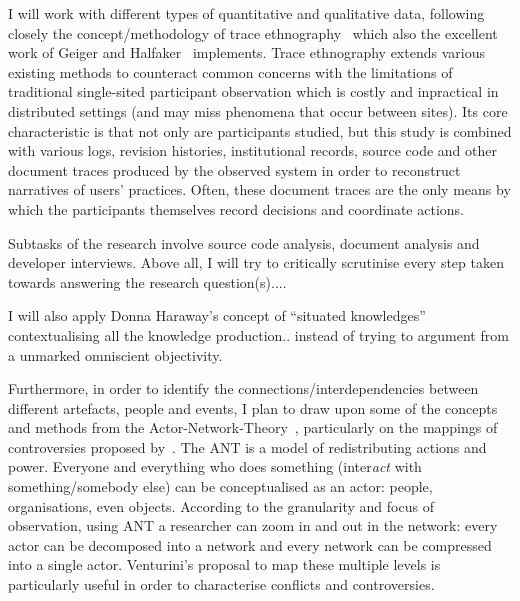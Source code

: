 \documentclass[pdftex,a4paper,11pt]{scrartcl}
\begin{document}
I will work with different types of quantitative and qualitative data, following closely the concept/methodology of trace ethnography~\cite{GeiRib2011} which also the excellent work of Geiger and Halfaker~\cite{GeiHal2017} implements.
Trace ethnography extends various existing methods to counteract common concerns with the limitations of traditional single-sited participant observation which is costly and inpractical in distributed settings (and may miss phenomena that occur between sites).
Its core characteristic is that not only are participants studied, but this study is combined with various logs, revision histories, institutional records, source code and other document traces produced by the observed system in order to reconstruct narratives of users' practices.
Often, these document traces are the only means by which the participants themselves record decisions and coordinate actions.


Subtasks of the research involve source code analysis, document analysis and developer interviews.
Above all, I will try to critically scrutinise every step taken towards answering the research question(s)....


I will also apply Donna Haraway's concept of ``situated knowledges'' contextualising all the knowledge production.. instead of trying to argument from a unmarked omniscient objectivity.

Furthermore, in order to identify the connections/interdependencies between different artefacts, people and events, I plan to draw upon some of the concepts and methods from the Actor-Network-Theory~\cite{Latour2010}, particularly on the mappings of controversies proposed by~\cite{Venturini2010a}.
The ANT is a model of redistributing actions and power.
Everyone and everything who does something (inter\emph{act} with something/somebody else) can be conceptualised as an actor: people, organisations, even objects.
According to the granularity and focus of observation, using ANT a researcher can zoom in and out in the network: every actor can be decomposed into a network and every network can be compressed into a single actor.
Venturini's proposal to map these multiple levels is particularly useful in order to characterise conflicts and controversies.
\end{document}
